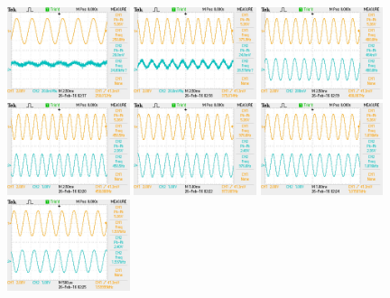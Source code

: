 \documentclass{article}
\begin{document}
\begin{figure}[H]
    \centering
    \includegraphics[width=0.32\textwidth]{250Hz}
    \includegraphics[width=0.32\textwidth]{375Hz}
    \includegraphics[width=0.32\textwidth]{400Hz}
    \includegraphics[width=0.32\textwidth]{450Hz}
    \includegraphics[width=0.32\textwidth]{977Hz}
    \includegraphics[width=0.32\textwidth]{1015Hz}
    \includegraphics[width=0.32\textwidth]{1600Hz}

\end{figure}
\end{document}
